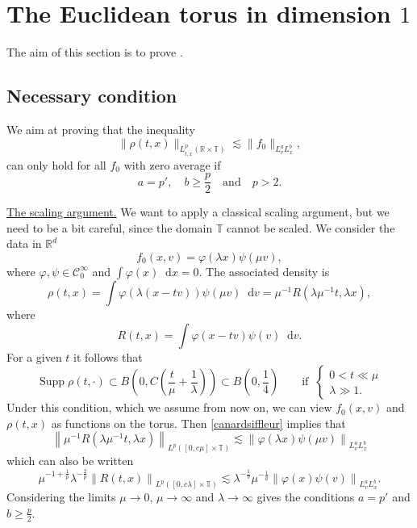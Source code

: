 \documentclass[11pt,a4paper,reqno]{amsart}
\theoremstyle{plain}
\theoremstyle{remark}
\newcommand{\dd}{\mathop{}\!\mathrm{d}}
\begin{document}
\section{The Euclidean torus in dimension \texorpdfstring{$1$}{1}}

The aim of this section is to prove .

\subsection{Necessary condition}

We aim at proving that the inequality
\begin{equation}
\label{canardsiffleur}
\| \rho(t,x) \|_{L^{p}_{t,x}(\mathbb{R} \times \mathbb{T})} \lesssim \| f_0 \|_{L^{a}_v L^{b}_x},
\end{equation}
can only hold for all $f_0$ with zero average if
\[
    a = p', \quad b \geq \frac{p}{2} \quad \text{and} \quad p>2.
\]

\noindent \underline{The scaling argument.} We want to apply a classical scaling argument, but we need to be a bit careful, since the domain $\mathbb{T}$ cannot be scaled. We consider the data in $\mathbb{R}^d$
\[
    f_0(x,v) = \varphi(\lambda x) \psi(\mu v),
\]
where $\varphi,\psi \in \mathcal{C}^\infty_0$ and $\int \varphi(x) \dd x = 0$. The associated density is
\[
    \rho(t,x) = \int \varphi(\lambda(x-tv)) \psi(\mu v) \dd v = \mu^{-1} R(\lambda \mu^{-1} t, \lambda x),
\]
where
\[
    R(t,x) = \int \varphi(x-tv) \psi(v) \dd v.
\]
For a given $t$ it follows that
\[
    \operatorname{Supp} \rho(t,\cdot) \subset B\left( 0,C\left( \frac t \mu + \frac 1 \lambda \right) \right) \subset B\left(0,\frac 14 \right) \qquad \text{if} \;\; 
    \begin{cases}
        0 < t \ll \mu    \\ \lambda \gg 1.
    \end{cases}
\]
Under this condition, which we assume from now on, we can view $f_0(x,v)$ and $\rho(t,x)$ as functions on the torus. Then \eqref{canardsiffleur} implies that
\[
    \left\| \mu^{-1} R(\lambda \mu^{-1} t,\lambda x) \right\|_{L^p([0,c \mu] \times \mathbb{T})} \lesssim \left\|\varphi(\lambda x) \psi(\mu v) \right\|_{L^a_v L^b_x}
\]
which can also be written
\[
    \mu^{-1+\frac 1p} \lambda^{-\frac {2}p} \left\|  R(t,x) \right\|_{L^p([0, c \lambda] \times \mathbb{T})} \lesssim \lambda^{-\frac 1 b} \mu^{-\frac 1 a} \left\| \varphi(x) \psi(v) \right\|_{L^a_v L^b_x}.
\]
Considering the limits $\mu \to 0$, $\mu \to \infty$ and $\lambda \to \infty$ gives the conditions $a = p'$ and $b \geq \frac{p}{2}$. 
\end{document}
